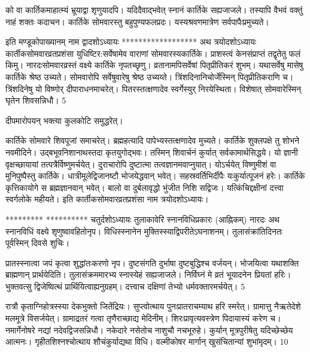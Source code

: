 को वा कार्तिकमाहात्म्यं भ्रूयाद्वा शृणुयादपि।
यदिदैवाद्भवेत् स्नानं कार्तिके सह्यजाजले।
तस्यापि वैभवं वक्तुं नाहं शक्तः कदाचन।
कार्तिके सोमवारस्तु बहुपुण्यफलप्रदः।
यस्यश्रवणमात्रेण सर्वपापैःप्रमुच्यते।

इति मण्डूकोपाख्यानम् नाम द्वादशोऽध्यायः
******************
अथ त्रयोदशोऽध्यायः
कार्तीकसोमवारव्रतप्रशंसा युधिष्टिर:सर्वेषामेव वाराणां सोमवारस्यकार्तिके।
प्राशस्त्वं केनसंप्राप्तं तद्वृतेतु फलं किमु।
नारदःसोमवारव्रस्तं वक्ष्ये कार्तिके नृपतच्छृणु।
व्रतानामपिसर्वेषां पितृप्रीतिकरं शुभम्।
यथासर्वेषु मासेषु कार्तिके श्रेष्ठ उच्यते।
सोमवारोपि सर्वेषुवारेषु श्रेष्ठ उच्यय्ते।
त्रिंशदिनानिचोर्जेस्मिन् पितृप्रीतिकराणि च।
त्रिंशदिनेषु यो विष्णोर् दीपाराधनमाचरेत्।
पितरस्तत्क्षणादेव स्वर्गेस्युर् निरयेस्थिता।
विशेषात् सोमवारेस्मिन् घृतेन शिवसन्निधौ।
5

दीपमारोपयन् भक्त्या कुलकोटि समुद्धरेत्।

कार्तिके सोमवारे शिवपूजां समाचरेत्।
ब्रह्महत्यादि पापेभ्यस्तत्क्षणादेव मुच्यते।
कार्तिके शुक्लपक्षे तु शोभने नवमीदिने।
उद्बभूवनिशानाथस्तदा कृतयुगोद्भवः।
तस्मिन् शिवार्चनं कुर्यात् सर्वकामार्थसिद्धये।
यो ज्ञानी वृक्षच्छायायां तत्पत्रैर्विष्णुमर्चयेत्।
दुराचारोपि दुष्टात्मा तत्वज्ञानमवाप्नुयात्।
योऽर्चयेत् विष्णुमीशं वा मुनिपुष्पैस्तु कार्तिके।
धात्रीमूलेद्विजानष्टौ भोजयेद्धवान् भवेत्।
सहस्रवर्तिभिर्दीपैः यःकुर्यात्पूजनं हरेः।
कार्तिके कृत्तिकायोगे स ब्रह्मज्ञानवान् भवेत्।
बालो वा दुर्बलावृद्धो भुंजीत निशि सद्विजः।
यत्किंचिद्दक्षीनां दत्त्वा स्वर्गलोके महीयते।
इति कार्तीकसोमवारव्रतप्रशंसा नाम
त्रयोदशोऽध्यायः।

*********
**********
चतुर्दशोऽध्यायः तुलाकावेरि स्नानविधिप्रकारः (आह्निकम्)
नारदः
अथ स्नानविधिं वक्ष्ये शृणुष्वावहितोनृप।
विधिस्स्नानेन मुक्तिस्स्याद्विपरीतेऽघनाशनम्।
तुलासंक्रांतिदिनतः पूर्वस्मिन् दिवसे शुचिः।

प्रातस्स्नात्वा जपं कृत्वा शुद्धांतःकरणो नृप।
दुष्टसंगति दुर्भाषा दुष्टबुद्धिश्च वर्जयन्।
भोजयित्वा यथाशक्ति ब्राह्मणान् प्रार्थयेदिति।
तुलासंक्रममारभ्य स्नास्येहं सह्यजाजले।
निर्विघ्नं मे व्रतं भूयादनेन प्रियतां हरिः।
भुक्तवत्सु द्विजेष्वित्थं प्रार्थियित्वाह्यनुग्रहम्।
दत्त्वाच दक्षिणां तेभ्यो धर्मवक्तारमर्चयेत्।
5

रात्रौ कृताग्निहोत्रस्स्या देकभुक्तो जितेंद्रियः।
सुप्त्वोत्थाय पुनःप्रातराचम्याथ हरि स्मरेत्।
ग्रामात्तु नैऋतेदेशे मलमूत्रे विसर्जयेत्।
ग्रामाद्रतरं गत्वा तृणैराच्छाद्य मेदिनीम्।
शिरःप्रावृत्यवस्त्रेण पिदायास्यं करेण च।
नमार्गेनोषरे नद्यां नदेवद्विजसन्निधौ।
नकेदारे नसेतोच नाशुचौ नचभूरुहे।
कुर्यान् मूत्रपुरीषेतु यदिच्छेच्छेय आत्मनः।
गृहीतशिश्नश्चोत्थाय शौचंकुर्याद्यथा विधि।
वल्मीकोषर मार्गान् खुसंचितान्यां शुभांमृदम्।
10

